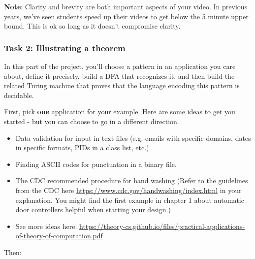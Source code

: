 {\bf Note}: Clarity and brevity are both important aspects of your video.  In previous years, we've seen 
students speed up their videos to get below the 5 minute upper bound. This is ok so long as it doesn't 
compromise clarity.

\subsubsection*{Task 2: Illustrating a theorem}

In this part of the project, you'll choose a pattern in an application you care about, 
define it precisely, build a DFA that recognizes it, and then build the related Turing machine
that proves that the language encoding this pattern is decidable.

First, pick {\bf one} application for your example. 
Here are some ideas to get you started - but you can choose to go in a different direction.
\begin{itemize}
\item Data validation for input in text files (e.g. emails with specific domains, dates in specific formats, PIDs in a class list, etc.)
\item Finding ASCII codes for punctuation in a binary file.
\item The CDC recommended procedure for hand washing (Refer to the guidelines from the CDC here 
\href{https://www.cdc.gov/handwashing/index.html}{https://www.cdc.gov/handwashing/index.html} in your explanation. 
You might find the first example in chapter 1 about automatic door controllers helpful when starting your design.)
\item See more ideas here:
\href{https://theory-cs.github.io/files/practical-applications-of-theory-of-computation.pdf}{https://theory-cs.github.io/files/practical-applications-of-theory-of-computation.pdf}
\end{itemize}
Then:
